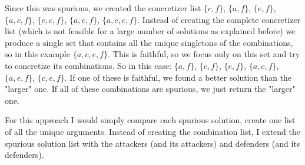 Since this was spurious, we created the concretizer list $\{c, f\}$, $\{a, f\}$, $\{e, f\}$, $\{a, c, f\}$, $\{c, e, f\}$, $\{a, e, f\}$, $\{a, c, e, f\}$. Instead of creating the complete concretizer list (which is not feasible for a large number of solutions as explained before)
we produce a single set that contains all the unique singletons of the combinations, so in this example  $\{a, c, e, f\}$. This is faithful, so we focus only on this set and try to concretize its combinations. So in this case: $\{a, f\}$, $\{c, f\}$, $\{e, f\}$,  $\{a, c, f\}$, $\{a, e, f\}$, $\{c, e, f\}$. If one of these
is faithful, we found a better solution than the "larger" one. If all of these combinations are spurious, we just return the "larger" one.

For this approach I would simply compare each spurious solution, create one list of all the unique arguments. Instead of creating the combination list, I extend the spurious solution list with the attackers (and its attackers) and defenders (and its defenders).
